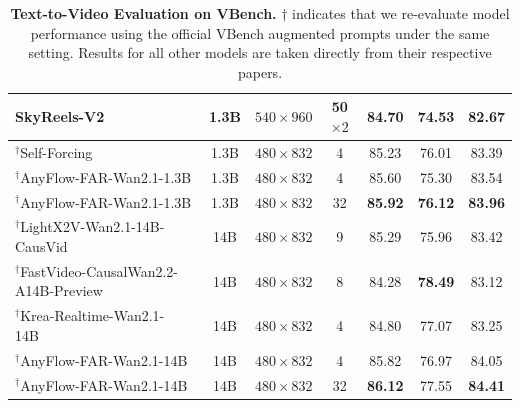 \documentclass{llmxive}
\providecommand{\tablecite}[1]{\cite{#1}}
\begin{document}
\begin{table}[!tb]
{\begin{tabular}{l c c c c c c}
SkyReels-V2~\tablecite{chen2025skyreels} & 1.3B & $540\times960$ & 50$\times2$ & 84.70 & 74.53 & 82.67 \\\midrule
$^\dag$Self-Forcing~\tablecite{huang2025selfforcing} & 1.3B & $480\times832$ & 4 & 85.23 & 76.01 & 83.39 \\
\rowcolor{mitblue}$^\dag$AnyFlow-FAR-Wan2.1-1.3B & 1.3B & $480\times832$ & 4 & 85.60 & 75.30 & 83.54 \\
\rowcolor{mitblue}$^\dag$AnyFlow-FAR-Wan2.1-1.3B & 1.3B & $480\times832$ & 32 & \textbf{85.92} & \textbf{76.12} & \textbf{83.96}\\\midrule
$^\dag$LightX2V-Wan2.1-14B-CausVid~\tablecite{lightx2v} & 14B & $480\times832$ & 9 & 85.29 & 75.96 & 83.42 \\
$^\dag$FastVideo-CausalWan2.2-A14B-Preview~\tablecite{causalwan2025} & 14B & $480\times832$ & 8 & 84.28 & \textbf{78.49} & 83.12 \\
$^\dag$Krea-Realtime-Wan2.1-14B~\tablecite{krea_realtime_14b} & 14B & $480\times832$ & 4 & 84.80 & 77.07 & 83.25 \\
\rowcolor{mitblue}$^\dag$AnyFlow-FAR-Wan2.1-14B & 14B & $480\times832$ & 4 & 85.82 & 76.97 &  84.05 \\
\rowcolor{mitblue}$^\dag$AnyFlow-FAR-Wan2.1-14B & 14B & $480\times832$ & 32 & \textbf{86.12} & 77.55 & \textbf{84.41} \\\midrule
\bottomrule
\end{tabular}}
\caption{\textbf{Text-to-Video Evaluation on VBench.} $\dag$ indicates that we re-evaluate model performance using the official VBench augmented prompts under the same setting. Results for all other models are taken directly from their respective papers.}
\label{tab:t2v_comparison}
\end{table}
\end{document}
